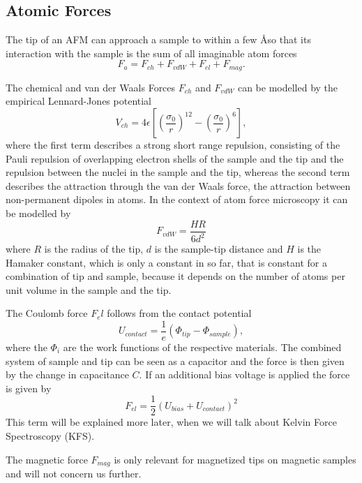 \documentclass[a4paper,twoside,11pt]{scrartcl}
\begin{document}
\subsection{Atomic Forces}

The tip of an AFM can approach a sample to within a few \AA so that its interaction with the sample is the sum of all imaginable atom forces
\begin{equation}
F_{a}=F_{ch}+F_{vdW}+F_{el}+F_{mag}.
\end{equation}

The chemical and van der Waals Forces $F_{ch}$ and $F_{vdW}$ can be modelled by the empirical Lennard-Jones potential
\begin{equation}
V_{ch}=4\epsilon\left[\left(\frac{\sigma_{0}}{r}\right)^{12}-\left(\frac{\sigma_{0}}{r}\right)^{6}\right],
\end{equation}
where the first term describes a strong short range repulsion, consisting of the Pauli repulsion of overlapping electron shells of the sample and the tip and the repulsion between the nuclei in the sample and the tip, whereas the second term describes the attraction through the van der Waals force, the attraction between non-permanent dipoles in atoms. In the context of atom force microscopy it can be modelled by
\begin{equation}
F_{vdW}=\frac{HR}{6d^{2}}
\end{equation}
where $R$ is the radius of the tip, $d$ is the sample-tip distance and $H$ is the Hamaker constant, which is only a constant in so far, that is constant for a combination of tip and sample, because it depends on the number of atoms per unit volume in the sample and the tip.

The Coulomb force $F_el$ follows from the contact potential
\begin{equation}
U_{contact}=\frac{1}{e}\left(\Phi_{tip}-\Phi_{sample}\right),
\end{equation}
where the $\Phi_i$ are the work functions of the respective materials. The combined system of sample and tip can be seen as a capacitor and the force is then given by the change in capacitance $C$. If an additional bias voltage is applied the force is given by
\begin{equation}
F_{el}=\frac{1}{2}(U_{bias}+U_{contact})^2 \label{eq:elec}
\end{equation}
This term will be explained more later, when we will talk about Kelvin Force Spectroscopy (KFS).

The magnetic force $F_{mag}$ is only relevant for magnetized tips on magnetic samples and will not concern us further.
\end{document}
